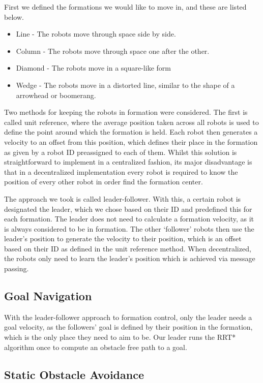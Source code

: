 \documentclass[letterpaper, 10 pt, conference]{ieeeconf}  %
\begin{document}
First we defined the formations we would like to move in, and these are listed below.

\begin{itemize}
\item Line - The robots move through space side by side.
\item Column - The robots move through space one after the other.
\item Diamond - The robots move in a square-like form
\item Wedge - The robots move in a distorted line, similar to the shape of a arrowhead or boomerang.
\end{itemize}

Two methods for keeping the robots in formation were considered. The first is called unit reference, where the average position taken across all robots is used to define the point around which the formation is held. Each robot then generates a velocity to an offset from this position, which defines their place in the formation as given by a robot ID preassigned to each of them. Whilst this solution is straightforward to implement in a centralized fashion, its major disadvantage is that in a decentralized implementation every robot is required to know the position of every other robot in order find the formation center.

The approach we took is called leader-follower. With this, a certain robot is designated the leader, which we chose based on their ID and predefined this for each formation. The leader does not need to calculate a formation velocity, as it is always considered to be in formation. The other `follower' robots then use the leader's position to generate the velocity to their position, which is an offset based on their ID as defined in the unit reference method. When decentralized, the robots only need to learn the leader's position which is achieved via message passing.

\subsection{Goal Navigation}

With the leader-follower approach to formation control, only the leader needs a goal velocity, as the followers' goal is defined by their position in the formation, which is the only place they need to aim to be. Our leader runs the RRT* algorithm once to compute an obstacle free path to a goal.

\subsection{Static Obstacle Avoidance}
\end{document}
